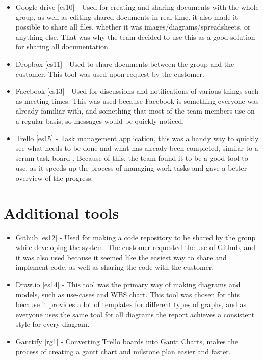 \begin{itemize}
	\item Google drive [es10] - Used for creating and sharing documents with the whole group, as well as editing shared documents in real-time. it also made it possible to share all files, whether it was images/diagrams/spreadsheets, or anything else. That was why the team decided to use this as a good solution for sharing all documentation.
	\item Dropbox [es11] - Used to share documents between the group and the customer. This tool was used upon request by the customer.
	\item Facebook [es13] - Used for discussions and notifications of various things such as meeting times. This was used because Facebook is something everyone was already familiar with, and something that most of the team members use on a regular basis, so messages would be quickly noticed.
	\item Trello [es15] - Task management application, this was a handy way to quickly see what needs to be done and what has already been completed, similar to a scrum task board . Because of this, the team found it to be a good tool to use, as it speeds up the process of managing work tasks and gave a better overview of the progress.
\end{itemize}

\section{Additional tools}

\begin{itemize}
	\item Github [es12] - Used for making a code repository to be shared by the group while developing the system. The customer requested the use of Github, and it was also used because it seemed like the easiest way to share and implement code, as well as sharing the code with the customer.
	\item Draw.io [es14] - This tool was the primary way of making diagrams and models, such as use-cases and WBS chart. This tool was chosen for this because it provides a lot of templates for different types of graphs, and as everyone uses the same tool for all diagrams the report achieves a consistent style for every diagram.
	\item Ganttify [rg1] - Converting Trello boards into Gantt Charts, makes the process of creating a gantt chart and milstone plan easier and faster.
\end{itemize}

\cleardoublepage